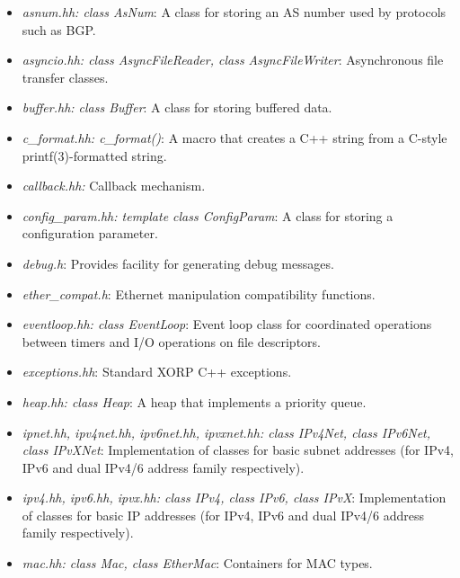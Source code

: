 \documentclass[11pt]{article}
\begin{document}
\begin{itemize}

  \item \emph{asnum.hh: class AsNum}: A class for storing an AS number
  used by protocols such as BGP.

  \item \emph{asyncio.hh: class AsyncFileReader, class AsyncFileWriter}:
  Asynchronous file transfer classes.

  \item \emph{buffer.hh: class Buffer}:  A class for storing buffered
  data.

  \item \emph{c\_format.hh: c\_format()}: A macro that creates a C++ string
  from a C-style printf(3)-formatted string.

  \item \emph{callback.hh:} Callback mechanism.

  \item \emph{config\_param.hh: template class ConfigParam}: A class for
  storing a configuration parameter.

  \item \emph{debug.h}: Provides facility for generating debug messages.

  \item \emph{ether\_compat.h}: Ethernet manipulation compatibility functions.

  \item \emph{eventloop.hh: class EventLoop}: Event loop class for
  coordinated operations between timers and I/O operations on file
  descriptors.

  \item \emph{exceptions.hh}: Standard XORP C++ exceptions.

  \item \emph{heap.hh: class Heap}: A heap that implements a priority
  queue.

  \item \emph{ipnet.hh, ipv4net.hh, ipv6net.hh, ipvxnet.hh: class
  IPv4Net, class IPv6Net, class IPvXNet}: Implementation of classes for
  basic subnet addresses (for IPv4, IPv6 and dual IPv4/6 address family
  respectively).

  \item \emph{ipv4.hh, ipv6.hh, ipvx.hh: class
  IPv4, class IPv6, class IPvX}: Implementation of classes for
  basic IP addresses (for IPv4, IPv6 and dual IPv4/6 address family
  respectively).

  \item \emph{mac.hh: class Mac, class EtherMac}: Containers for
  MAC types.


\end{itemize}
\end{document}
